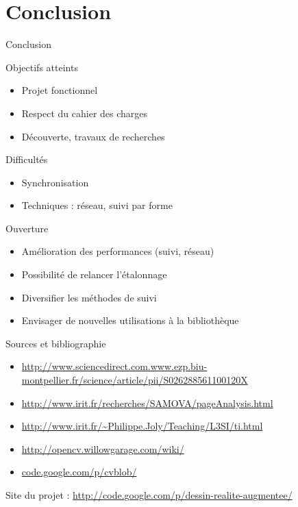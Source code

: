 \documentclass{beamer}
\begin{document}
	\section{Conclusion}
		\begin{frame}{Conclusion}
			\begin{exampleblock}{Objectifs atteints}
				\begin{itemize}
				\item Projet fonctionnel
				\item Respect du cahier des charges
				\item Découverte, travaux de recherches
				\end{itemize}
			\end{exampleblock}
			\pause
			
			\begin{alertblock}{Difficultés}
				\begin{itemize}
				\item Synchronisation 	
				\item Techniques : réseau, suivi par forme
				\end{itemize}
			\end{alertblock}
			\pause
			
			\begin{block}{Ouverture}
				\begin{itemize}
				\item Amélioration des performances (suivi, réseau)
				\item Possibilité de relancer l'étalonnage
				\item Diversifier les méthodes de suivi
				\item Envisager de nouvelles utilisations à la bibliothèque
				\end{itemize}
			\end{block}
		\end{frame}
                 
	\begin{frame}{Sources et bibliographie}
   
		\begin{itemize}
		\item{\url{http://www.sciencedirect.com.www.ezp.biu-montpellier.fr/science/article/pii/S026288561100120X}}
		\item{\url{http://www.irit.fr/recherches/SAMOVA/pageAnalysis.html}}
		\item{\url{http://www.irit.fr/~Philippe.Joly/Teaching/L3SI/ti.html}}
		\item{\url{http://opencv.willowgarage.com/wiki/}}
		\item{\url{code.google.com/p/cvblob/} }
		\end{itemize}
		Site du projet : \url{http://code.google.com/p/dessin-realite-augmentee/}
	\end{frame}
\end{document}
